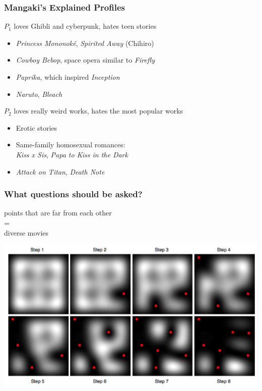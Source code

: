 \documentclass[]{beamer}
\begin{document}
\begin{frame}
    \frametitle{Mangaki's Explained Profiles}
    \begin{block}{$P_1$ loves Ghibli and cyberpunk, hates teen stories}
    \begin{itemize}
    \item[\good] \emph{Princess Mononoké}, \emph{Spirited Away} (Chihiro)
    \item[\good] \emph{Cowboy Bebop}, space opera similar to \emph{Firefly}
    \item[\good] \emph{Paprika}, which inspired \emph{Inception}
    \item[\bad] \emph{Naruto}, \emph{Bleach}
    \end{itemize}
    \end{block}
    \pause
    \begin{block}{$P_2$ loves really weird works, hates the most popular works}
    \begin{itemize}
    \item[\good] Erotic stories
    \item[\good] Same-family homosexual romances:\\\emph{Kiss x Sis}, \emph{Papa to Kiss in the Dark}
    \item[\bad] \emph{Attack on Titan}, \emph{Death Note}
    \end{itemize}
    \end{block}
\end{frame}

\begin{frame}
  \frametitle{What questions should be asked?}
  \centering
  points that are \alert{far from each other}\\
  =\\
  \alert{diverse} movies\bigskip

  \includegraphics[width=\linewidth]{figures/dpp.png}
\end{frame}
\end{document}
